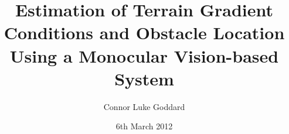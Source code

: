 

\title{Estimation of Terrain Gradient Conditions and Obstacle Location Using a Monocular Vision-based System}

\author{Connor Luke Goddard}




\date{6th March 2012} %




\maketitle



